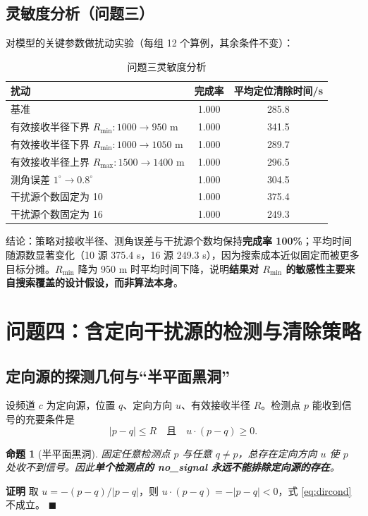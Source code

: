 \documentclass[withoutpreface,bwprint]{cumcmthesis}
\newtheorem{proposition}{\heiti 命题}
\newenvironment{pf}{\par\noindent\textbf{证明}\quad}{\hfill$\blacksquare$\par}
\begin{document}
\subsection{灵敏度分析（问题三）}

对模型的关键参数做扰动实验（每组 12 个算例，其余条件不变）：

\begin{table}[H]
\centering
\caption{问题三灵敏度分析}
\label{tab:q3sens}
\begin{tabular}{lcc}
\toprule
扰动 & 完成率 & 平均定位清除时间/s\\
\midrule
基准 & 1.000 & 285.8\\
有效接收半径下界 $R_{\min}:1000\to950$ m & 1.000 & 341.5\\
有效接收半径下界 $R_{\min}:1000\to1050$ m & 1.000 & 289.7\\
有效接收半径上界 $R_{\max}:1500\to1400$ m & 1.000 & 296.5\\
测角误差 $1^{\circ}\to0.8^{\circ}$ & 1.000 & 304.5\\
干扰源个数固定为 10 & 1.000 & 375.4\\
干扰源个数固定为 16 & 1.000 & 249.3\\
\bottomrule
\end{tabular}
\end{table}

结论：策略对接收半径、测角误差与干扰源个数均保持\textbf{完成率 100\%}；平均时间随源数显著变化（10 源 375.4 s，16 源 249.3 s），因为搜索成本近似固定而被更多目标分摊。$R_{\min}$ 降为 950 m 时平均时间下降，说明\textbf{结果对 $R_{\min}$ 的敏感性主要来自搜索覆盖的设计假设，而非算法本身}。

\section{问题四：含定向干扰源的检测与清除策略}

\subsection{定向源的探测几何与“半平面黑洞”}

设频道 $c$ 为定向源，位置 $q$、定向方向 $u$、有效接收半径 $R$。检测点 $p$ 能收到信号的充要条件是
\begin{equation}
|p-q|\le R\quad\text{且}\quad u\cdot(p-q)\ge0 .
\label{eq:dircond}
\end{equation}

\begin{proposition}[半平面黑洞]\label{prop:blackhole}
固定任意检测点 $p$ 与任意 $q\ne p$，总存在定向方向 $u$ 使 $p$ 处收不到信号。因此\textbf{单个检测点的 no\_signal 永远不能排除定向源的存在}。
\end{proposition}
\begin{pf}
取 $u=-(p-q)/|p-q|$，则 $u\cdot(p-q)=-|p-q|<0$，式 \eqref{eq:dircond} 不成立。
\end{pf}
\end{document}

